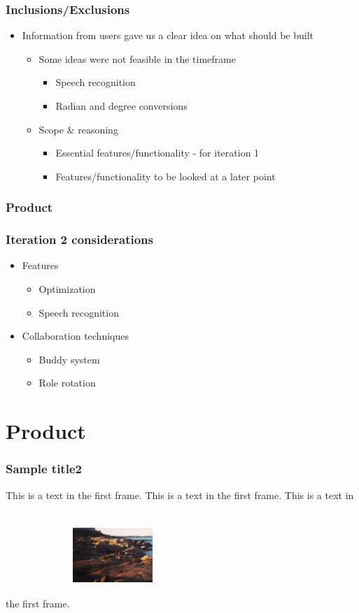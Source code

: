 \documentclass{beamer}
\begin{document}
\begin{frame}
\frametitle{Inclusions/Exclusions}
\begin{itemize}
 \item Information from users gave us a clear idea on what should be built
  \begin{itemize}
  \item Some ideas were not feasible in the timeframe
  \begin{itemize}
    \item Speech recognition
    \item Radian and degree conversions
  \end{itemize}
  \item Scope \& reasoning
    \begin{itemize}
    \item Essential features/functionality - for iteration 1
    \item Features/functionality to be looked at a later point
  \end{itemize}
  \end{itemize}
  \end{itemize}
\end{frame}

\begin{frame}
\frametitle{Product}
\end{frame}

\begin{frame}
\frametitle{Iteration 2 considerations}
\begin{itemize}
 \item Features
  \begin{itemize}
   \item Optimization
   \item Speech recognition
  \end{itemize}
 \item Collaboration techniques
  \begin{itemize}
   \item Buddy system
   \item Role rotation
  \end{itemize}
\end{itemize}
\end{frame}



\section{Product}
\begin{frame}
\frametitle{Sample title2}
This is a text in the first frame. This is a text in the first frame. This is a text in the first frame.
\includegraphics[width=3cm, height=4cm]{Screen Shot}
\end{frame}
\end{document}

